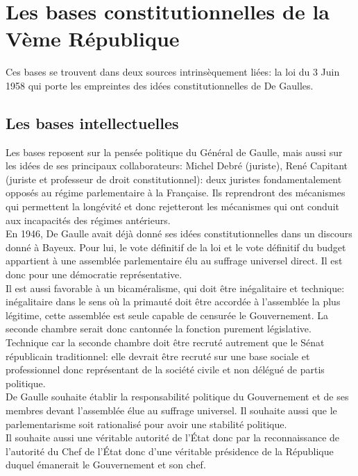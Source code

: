 \documentclass[12pt, a4paper, openany]{book}
\begin{document}
\section{Les bases constitutionnelles de la Vème République}

Ces bases se trouvent dans deux sources intrinsèquement liées: la loi du 3 Juin 1958 qui porte les empreintes des idées constitutionnelles de De Gaulles.

\subsection{Les bases intellectuelles}

Les bases reposent sur la pensée politique du Général de Gaulle, mais aussi sur les idées de ses principaux collaborateurs: Michel Debré (juriste), René Capitant (juriste et professeur de droit constitutionnel): deux juristes fondamentalement opposés au régime parlementaire à la Française. Ils reprendront des mécanismes qui permettent la longévité et donc rejetteront les mécanismes qui ont conduit aux incapacités des régimes antérieurs. \\
En 1946, De Gaulle avait déjà donné ses idées constitutionnelles dans un discours donné à Bayeux. Pour lui, le vote définitif de la loi et le vote définitif du budget appartient à une assemblée parlementaire élu au suffrage universel direct. Il est donc pour une démocratie représentative. \\
Il est aussi favorable à un bicaméralisme, qui doit être inégalitaire et technique: inégalitaire dans le sens où la primauté doit être accordée à l'assemblée la plus légitime, cette assemblée est seule capable de censurée le Gouvernement. La seconde chambre serait donc cantonnée la fonction purement législative. Technique car la seconde chambre doit être recruté autrement que le Sénat républicain traditionnel: elle devrait être recruté sur une base sociale et professionnel donc représentant de la société civile et non délégué de partis politique. \\
De Gaulle souhaite établir la responsabilité politique du Gouvernement et de ses membres devant l'assemblée élue au suffrage universel. Il souhaite aussi que le parlementarisme soit rationalisé pour avoir une stabilité politique. \\
Il souhaite aussi une véritable autorité de l'État donc par la reconnaissance de l'autorité du Chef de l'État donc d'une véritable présidence de la République duquel émanerait le Gouvernement et son chef. \\
\end{document}
